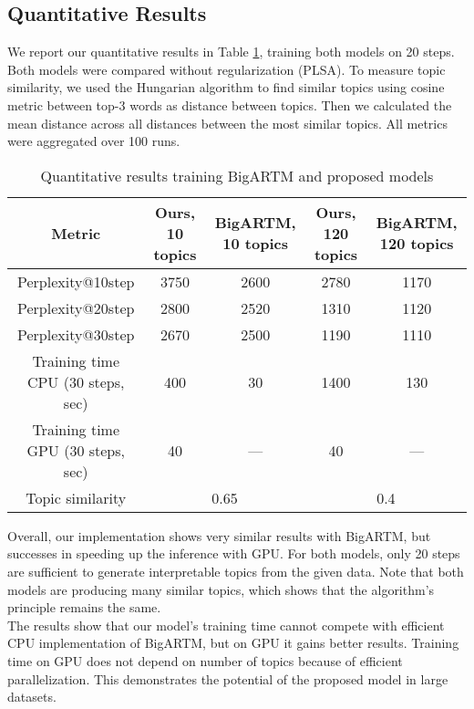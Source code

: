 \documentclass{article}
\begin{document}
\subsection{Quantitative Results}
We report our quantitative results in Table \ref{tab:quantitative-results}, training both models on 20 steps. Both models were compared without regularization (PLSA). To measure topic similarity, we used the Hungarian algorithm to find similar topics using cosine metric between top-3 words as distance between topics. Then we calculated the mean distance across all distances between the most similar topics. All metrics were aggregated over 100 runs. \\

\begin{table}[htbp]
\centering
    \begin{tabular}{|c|c|c|c|c|}
        \hline
        Metric & Ours, 10 topics & BigARTM, 10 topics & Ours, 120 topics & BigARTM, 120 topics \\
        \hline
        Perplexity@10step   & 3750 & 2600 & 2780 & 1170 \\
        \hline
        Perplexity@20step   & 2800 & 2520 & 1310 & 1120 \\
        \hline
        Perplexity@30step   & 2670 & 2500 & 1190 & 1110 \\
        \hline
        Training time CPU (30 steps, sec)  & 400 & 30 & 1400 & 130 \\
        \hline
        Training time GPU (30 steps, sec) & 40 & --- & 40 & --- \\
        \hline
        Topic similarity    & \multicolumn{2}{|c|}{0.65} & \multicolumn{2}{|c|}{0.4} \\
        \hline
    \end{tabular}
\caption{Quantitative results training BigARTM and proposed models}
\label{tab:quantitative-results}
\end{table}

Overall, our implementation shows very similar results with BigARTM, but successes in speeding up the inference with GPU. For both models, only 20 steps are sufficient to generate interpretable topics from the given data. Note that both models are producing many similar topics, which shows that the algorithm's principle remains the same. \\

The results show that our model's training time cannot compete with efficient CPU implementation of BigARTM, but on GPU it gains better results. Training time on GPU does not depend on number of topics because of efficient parallelization. This demonstrates the potential of the proposed model in large datasets.
\end{document}
